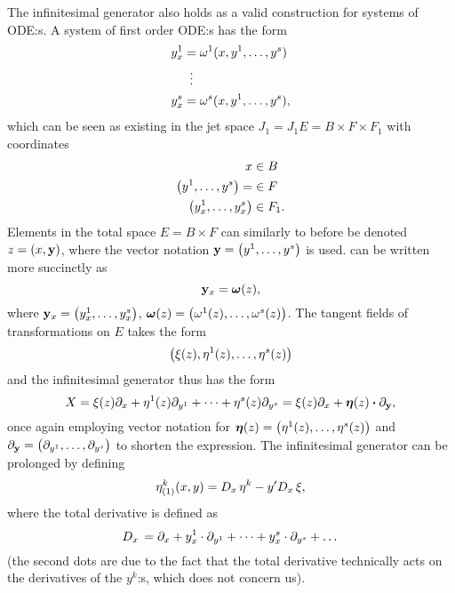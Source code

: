 The infinitesimal generator also holds as a valid construction for systems of ODE:s.
A system of first order ODE:s has the form
\begin{align}
  \begin{split} \label{eq:first-order-system-ode}
    y^1_x &= \omega^1(x, y^1, \dots, y^s) \\
    &\equalsvdots \\
    y^s_x &= \omega^s(x, y^1, \dots, y^s),
  \end{split}
\end{align}
which can be seen as existing in the jet space \(J_1 = J_1 E = B \times F \times F_1\) with coordinates
\begin{align}
  x &\in B \\
  \qty(y^1, \dots, y^s) = &\in F \\
  \qty(y^1_x, \dots, y^s_x) &\in F_1.
\end{align}
Elements in the total space \(E = B \times F\) can similarly to before be denoted \(z = \qty(x, \vb{y})\), where the vector notation \(\vb{y} = \qty(y^1, \dots, y^s)\) is used.
 can be written more succinctly as
\begin{equation} \label{eq:first-order-system-ode-short}
  \vb{y}_x = \vb*{\omega}(z),
\end{equation}
where \(\vb{y}_x = \qty(y^1_x, \dots, y^s_x)\), \(\vb*{\omega}(z) = \qty(\omega^1(z), \dots, \omega^s(z))\).
The tangent fields of transformations on \(E\) takes the form
\begin{equation} \label{eq:tangent-field-gen}
  \pqty{\xi(z), \eta^1(z), \dots, \eta^s(z)}
\end{equation}
and the infinitesimal generator thus has the form
\begin{equation}
  X = \xi(z) \partial_x + \eta^1(z) \partial_{y^1} + \dots + \eta^s(z) \partial_{y^s} = \xi(z) \partial_x + \vb*{\eta}(z) \vdot \partial_{\vb{y}},
\end{equation}
once again employing vector notation for \(\vb*{\eta}(z) = \qty(\eta^1(z), \dots, \eta^s(z))\) and \(\partial_{\vb{y}} = \qty(\partial_{y^1}, \dots, \partial_{y^s})\) to shorten the expression.
The infinitesimal generator can be prolonged by defining
\begin{equation}
  {\eta^k_{(1)}}(x,y) =
  D_{x}\, \eta^k - y' D_{x}\, \xi,
\end{equation}
where the total derivative is defined as
\begin{equation}
  D_{x}\, = \partial_x + y^1_x \cdot \partial_{y^1} + \dots + y^s_x \cdot \partial_{y^s} + \dots
\end{equation}
(the second dots are due to the fact that the total derivative technically acts on the derivatives of the \(y^k\):s, which does not concern us).

